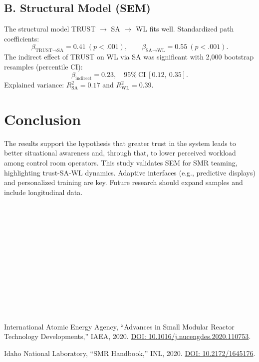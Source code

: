 \documentclass[conference]{IEEEtran}
\begin{document}
\begin{table}[t]
\subsection{B. Structural Model (SEM)}
The structural model TRUST $\rightarrow$ SA $\rightarrow$ WL fits well. Standardized path coefficients: 
\[
\beta_{\text{TRUST}\to\text{SA}}=0.41\ (p<.001),\qquad
\beta_{\text{SA}\to\text{WL}}=0.55\ (p<.001).
\]
The indirect effect of TRUST on WL via SA was significant with 2,000 bootstrap resamples (percentile CI):
\[
\beta_{\text{indirect}}=0.23,\quad 95\%\ \text{CI}\ [0.12,\ 0.35].
\]
Explained variance: $R^2_{\text{SA}}=0.17$ and $R^2_{\text{WL}}=0.39$.

\section{Conclusion}
The results support the hypothesis that greater trust in the system leads to better situational awareness and, through that, to lower perceived workload among control room operators.
This study validates SEM for SMR teaming, highlighting trust-SA-WL dynamics. Adaptive interfaces (e.g., predictive displays) and personalized training are key. Future research should expand samples and include longitudinal data.\\
\\



\\
\\ 
\\
\\
\\

\\


\\

\begin{thebibliography}{54}\\

\\
\\

\\

International Atomic Energy Agency, ``Advances in Small Modular Reactor Technology Developments,'' IAEA, 2020. \href{https://doi.org/10.1016/j.nucengdes.2020.110753}{DOI: 10.1016/j.nucengdes.2020.110753}.

Idaho National Laboratory, ``SMR Handbook,'' INL, 2020. \href{https://doi.org/10.2172/1645176}{DOI: 10.2172/1645176}.


\end{thebibliography}
\end{table}
\end{document}
